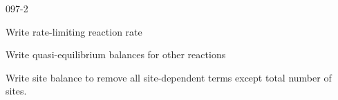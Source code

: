 \begin{mitframe}{097-2}
    	\begin{listtwo}
        	\item Write rate-limiting reaction rate
            \item Write quasi-equilibrium balances for other reactions
            \item Write site balance to remove all site-dependent terms except total number of sites.
        \end{listtwo}
\end{mitframe}